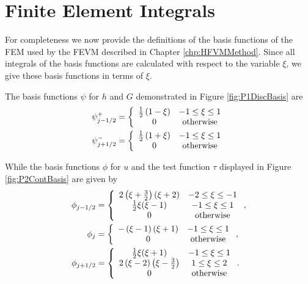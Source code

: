 \chapter{Finite Element Integrals}
\label{app:FEMIntegrals}
For completeness we now provide the definitions of the basis functions of the FEM used by the FEVM described in Chapter \ref{chp:HFVMMethod}. Since all integrals of the basis functions are calculated with respect to the variable $\xi$, we give these basis functions in terms of $\xi$.

The basis functions $\psi$ for $h$ and $G$ demonstrated in Figure \ref{fig:P1DiscBasis} are
\begin{align}
\psi^+_{j-1/2} &= \left\lbrace \begin{array}{c c}
\frac{1}{2}\left(1 - \xi\right) & -1 \le \xi \le 1\\
0 & \text{otherwise}
\end{array} \right. \\
\psi^-_{j+1/2} &= \left\lbrace \begin{array}{c c}
\frac{1}{2}\left(1 + \xi\right) & -1 \le \xi \le 1\\
0 & \text{otherwise}
\end{array} \right. 
\end{align}

While the basis functions $\phi$ for $u$ and the test function $\tau$ displayed in Figure \ref{fig:P2ContBasis} are given by
\begin{align}
\phi_{j-1/2} &= \left\lbrace \begin{array}{c c}
2 \left(\xi + \frac{3}{2}\right)\left(\xi + 2\right) & -2 \le \xi \le -1\\
\frac{1}{2}\xi(\xi - 1) & -1 \le \xi \le 1\\
0 & \text{otherwise}\end{array} \right.  ,\\
\phi_{j} &= \left\lbrace \begin{array}{c c}
-\left(\xi - 1\right)\left(\xi + 1\right) & -1 \le \xi \le 1\\
0 & \text{otherwise}
\end{array} \right. , \\ 
\phi_{j+1/2} &= \left\lbrace \begin{array}{c c}
\frac{1}{2}\xi(\xi + 1) & -1 \le \xi \le 1\\
2\left(\xi - 2\right)\left(\xi - \frac{3}{2} \right) & 1 \le \xi \le 2\\
0 & \text{otherwise}
\end{array} \right. .\\ 
\end{align}

